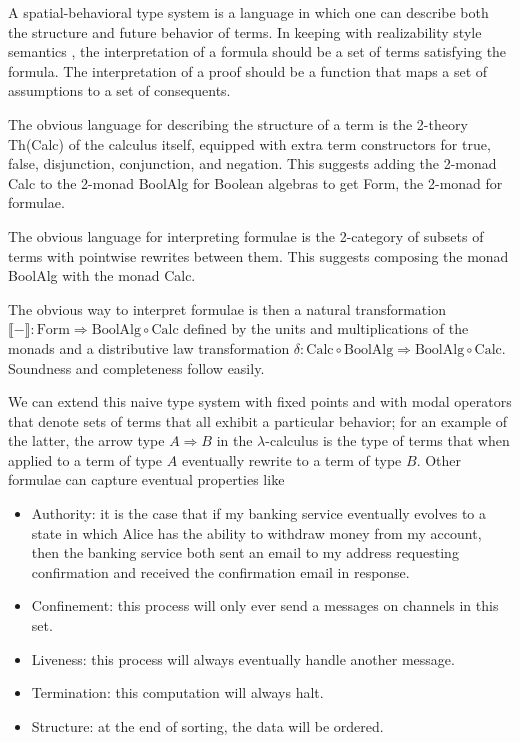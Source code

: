 \documentclass{llncs}
\newcommand{\interp}[1]{\llbracket #1 \rrbracket}
\newcommand{\maps}{\colon}
\newcommand{\Calc}{\mathrm{Calc}}
\newcommand{\BoolAlg}{\mathrm{BoolAlg}}
\renewcommand{\Form}{\mathrm{Form}}
\begin{document}
  A spatial-behavioral type system is a language in which one can describe both the structure and future behavior of terms.  In keeping with realizability style semantics  \cite{Krivine-TheCurryHowardCorre}, the interpretation of a formula should be a set of terms satisfying the formula.  The interpretation of a proof should be a function that maps a set of assumptions to a set of consequents.

  The obvious language for describing the structure of a term is the 2-theory Th(Calc) of the calculus itself, equipped with extra term constructors for true, false, disjunction, conjunction, and negation.  This suggests adding the 2-monad Calc to the 2-monad BoolAlg for Boolean algebras to get Form, the 2-monad for formulae.

  The obvious language for interpreting formulae is the 2-category of subsets of terms with pointwise rewrites between them.  This suggests composing the monad BoolAlg with the monad Calc.

  The obvious way to interpret formulae is then a natural transformation $\interp{-} \maps \Form \Rightarrow \BoolAlg \circ \Calc$ defined by the units and multiplications of the monads and a distributive law transformation $\delta\maps \Calc \circ \BoolAlg \Rightarrow \BoolAlg \circ \Calc.$  Soundness and completeness follow easily.

  We can extend this naive type system with fixed points and with modal operators that denote sets of terms that all exhibit a particular behavior; for an example of the latter, the arrow type $A \Rightarrow B$ in the $\lambda$-calculus is the type of terms that when applied to a term of type $A$ eventually rewrite to a term of type $B$.  Other formulae can capture eventual properties like
\begin{itemize}
  \item Authority: it is the case that if my banking service eventually evolves to a state in which Alice has the ability to withdraw money from my account, then the banking service both sent an email to my address requesting confirmation and received the confirmation email in response.
  \item Confinement: this process will only ever send a messages on channels in this set.
  \item Liveness: this process will always eventually handle another message.
  \item Termination: this computation will always halt.
  \item Structure: at the end of sorting, the data will be ordered.
\end{itemize}
\end{document}
